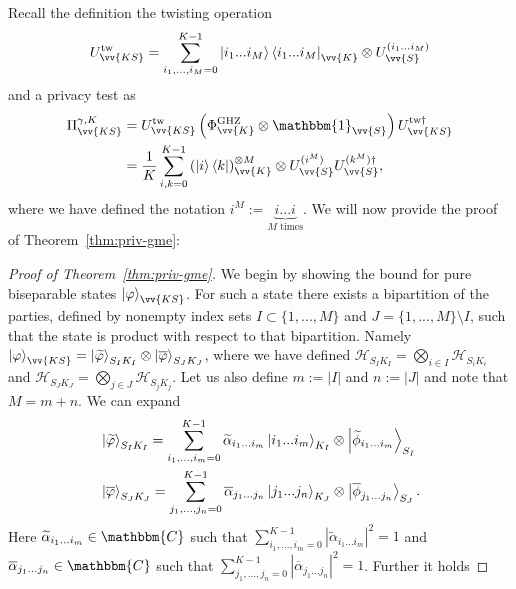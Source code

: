 \documentclass[aps,pra,twocolumn,superscriptaddress,longbibliography]{revtex4-1}
\def\GHZ{\operatorname{GHZ}}
\def\({\left(}
\def\){\right)}
\newcommand{\mc}[1]{\mathcal{#1}}
\newcommand{\bbm}[1]{\mathbbm{#1}}
\begin{document}
\begin{appendix}
Recall the definition the twisting operation
\begin{equation}
U^\text{tw}_{\vv{KS}}=\sum_{i_1,...,i_M=0}^{K-1}\ket{i_1...i_M}\bra{i_1...i_M}_{\vv{K}}\otimes U_{\vv{S}}^{(i_1...i_M)}
\end{equation}
and a privacy test as
\begin{align}
\Pi^{\gamma,K}_{\vv{KS}}&=U^\text{tw}_{\vv{KS}}\(\Phi^{\GHZ}_{\vv{K}}\otimes\bbm{1}_{\vv{S}}\)U^{\text{tw}\dag}_{\vv{KS}}\\
&=\frac{1}{K}\sum_{i,k=0}^{K-1}\(\ket{i}\bra{k}\)^{\otimes M}_{\vv{K}}\otimes U_{\vv{S}}^{(i^M)}U_{\vv{S}}^{(k^M)\dag},
\end{align}
where we have defined the notation $i^M:=\underbrace{i...i}_{M\text{ times}}$. We will now provide the proof of Theorem~\ref{thm:priv-gme}:
\begin{proof}[Proof of Theorem~\ref{thm:priv-gme}]
We begin by showing the bound for pure biseparable states $\ket{\varphi}_{\vv{KS}}$. For such a state there exists a bipartition of the parties, defined by nonempty index sets $I\subset\{1,...,M\}$ and $J=\{1,...,M\}\setminus I$, such that the state is product with respect to that bipartition.  Namely $\ket{\varphi}_{\vv{KS}}=\ket{\widetilde\varphi}_{S_{I}K_{I}}\otimes\ket{\overline\varphi}_{S_{J}K_{J}}$, where we have defined $\mc{H}_{S_{I}K_{I}}=\bigotimes_{i\in I}\mc{H}_{S_{i}K_{i}}$ and $\mc{H}_{S_{J}K_{J}}=\bigotimes_{j\in J}\mc{H}_{S_{j}K_{j}}$.
Let us also define $m:=|I|$ and $n:=|J|$ and note that $M=m+n$. We can expand
\begin{align}
&\ket{\widetilde\varphi}_{S_{I}K_{I}}=\sum_{i_1,...,i_{m}=0}^{K-1}\widetilde{\alpha}_{i_1...i_{m}}\ket{i_1...i_{m}}_{K_{I}}\otimes\ket{\widetilde{\phi}_{i_1...i_{m}}}_{S_{I}}\\
&\ket{\overline\varphi}_{S_{J}K_{J}}=\sum_{j_1,...,j_{n}=0}^{K-1}\overline{\alpha}_{j_1...j_{n}}\ket{j_1...j_{n}}_{K_J}\otimes\ket{\overline{\phi}_{j_1...j_{n}}}_{S_J}.
\end{align}
Here $\widetilde{\alpha}_{i_1...i_{m}}\in\bbm{C}$ such that $\sum_{i_1,...,i_{m}=0}^{K-1}|\widetilde{\alpha}_{i_1...i_{m}}|^2=1$ and $\overline{\alpha}_{j_1...j_{n}}\in\bbm{C}$ such that $\sum_{j_1,...,j_{n}=0}^{K-1}|\overline{\alpha}_{j_1...j_{n}}|^2=1$. Further it holds


\end{proof}
\end{appendix}
\end{document}

